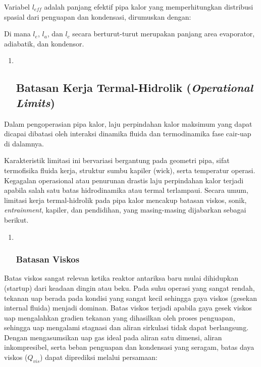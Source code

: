 \documentclass[
]{article}
\begin{document}
Variabel \({l}_{eff}\) adalah panjang efektif pipa kalor yang
memperhitungkan distribusi spasial dari penguapan dan kondensasi,
dirumuskan dengan:

\href{https://www.codecogs.com/eqnedit.php?latex=l_\%7Beff\%7D\%3D0.5l_e\%2Bl_a\%2B0.5l_c\#0}{}

Di mana \({l}_{e}\), \({l}_{a}\), dan \({l}_{c}\) secara berturut-turut
merupakan panjang area evaporator, adiabatik, dan kondensor.

\begin{enumerate}
\def\labelenumi{\arabic{enumi}.}
\setcounter{enumi}{2}
\item ~
  \subsection{\texorpdfstring{\textbf{Batasan Kerja Termal-Hidrolik
  (\emph{Operational
  Limits})}}{Batasan Kerja Termal-Hidrolik (Operational Limits)}}\label{batasan-kerja-termal-hidrolik-operational-limits}
\end{enumerate}

Dalam pengoperasian pipa kalor, laju perpindahan kalor maksimum yang
dapat dicapai dibatasi oleh interaksi dinamika fluida dan termodinamika
fase cair-uap di dalamnya.

Karakteristik limitasi ini bervariasi bergantung pada geometri pipa,
sifat termofisika fluida kerja, struktur sumbu kapiler (wick), serta
temperatur operasi. Kegagalan operasional atau penurunan drastis laju
perpindahan kalor terjadi apabila salah satu batas hidrodinamika atau
termal terlampaui. Secara umum, limitasi kerja termal-hidrolik pada pipa
kalor mencakup batasan viskos, sonik, \emph{entrainment}, kapiler, dan
pendidihan, yang masing-masing dijabarkan sebagai berikut.

\begin{enumerate}
\def\labelenumi{\arabic{enumi}.}
\item ~
  \subsubsection{\texorpdfstring{\textbf{Batasan
  Viskos}}{Batasan Viskos}}\label{batasan-viskos}
\end{enumerate}

Batas viskos sangat relevan ketika reaktor antariksa baru mulai
dihidupkan (startup) dari keadaan dingin atau beku. Pada suhu operasi
yang sangat rendah, tekanan uap berada pada kondisi yang sangat kecil
sehingga gaya viskos (gesekan internal fluida) menjadi dominan. Batas
viskos terjadi apabila gaya gesek viskos uap mengalahkan gradien tekanan
yang dihasilkan oleh proses penguapan, sehingga uap mengalami stagnasi
dan aliran sirkulasi tidak dapat berlangsung. Dengan mengasumsikan uap
gas ideal pada aliran satu dimensi, aliran inkompresibel, serta beban
penguapan dan kondensasi yang seragam, batas daya viskos (\({Q}_{vis}\))
dapat diprediksi melalui persamaan:
\end{document}
